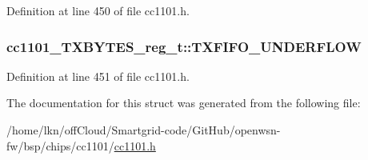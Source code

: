 Definition at line 450 of file cc1101.\+h.

\subsubsection[{\texorpdfstring{T\+X\+F\+I\+F\+O\+\_\+\+U\+N\+D\+E\+R\+F\+L\+OW}{TXFIFO_UNDERFLOW}}]{ cc1101\+\_\+\+T\+X\+B\+Y\+T\+E\+S\+\_\+reg\+\_\+t\+::\+T\+X\+F\+I\+F\+O\+\_\+\+U\+N\+D\+E\+R\+F\+L\+OW}\hypertarget{structcc1101___t_x_b_y_t_e_s__reg__t_a0e60707195aa9b1c9d1e3fb472c4e6ed}{}\label{structcc1101___t_x_b_y_t_e_s__reg__t_a0e60707195aa9b1c9d1e3fb472c4e6ed}


Definition at line 451 of file cc1101.\+h.



The documentation for this struct was generated from the following file\+:\begin{DoxyCompactItemize}
\item 
/home/lkn/off\+Cloud/\+Smartgrid-\/code/\+Git\+Hub/openwsn-\/fw/bsp/chips/cc1101/\hyperlink{cc1101_8h}{cc1101.\+h}\end{DoxyCompactItemize}
